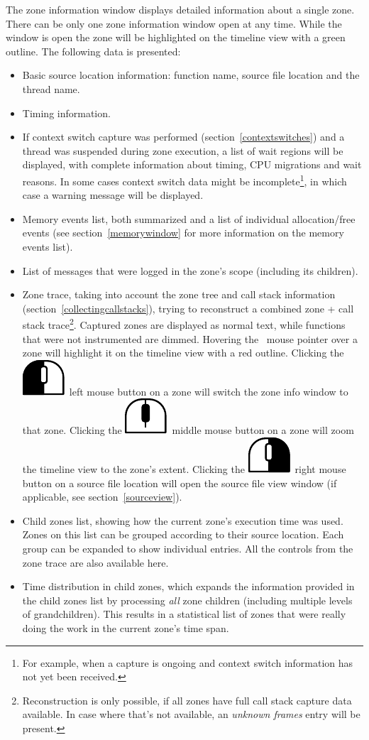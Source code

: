 \documentclass[hidelinks,titlepage,a4paper]{article}
\newcommand{\LMB}{\includegraphics[height=.8\baselineskip]{icons/lmb}}
\newcommand{\RMB}{\includegraphics[height=.8\baselineskip]{icons/rmb}}
\newcommand{\MMB}{\includegraphics[height=.8\baselineskip]{icons/mmb}}
\begin{document}
The zone information window displays detailed information about a single zone. There can be only one zone information window open at any time. While the window is open the zone will be highlighted on the timeline view with a green outline. The following data is presented:

\begin{itemize}
\item Basic source location information: function name, source file location and the thread name.
\item Timing information.
\item If context switch capture was performed (section~\ref{contextswitches}) and a thread was suspended during zone execution, a list of wait regions will be displayed, with complete information about timing, CPU migrations and wait reasons. In some cases context switch data might be incomplete\footnote{For example, when a capture is ongoing and context switch information has not yet been received.}, in which case a warning message will be displayed.
\item Memory events list, both summarized and a list of individual allocation/free events (see section~\ref{memorywindow} for more information on the memory events list).
\item List of messages that were logged in the zone's scope (including its children).
\item Zone trace, taking into account the zone tree and call stack information (section~\ref{collectingcallstacks}), trying to reconstruct a combined zone + call stack trace\footnote{Reconstruction is only possible, if all zones have full call stack capture data available. In case where that's not available, an \emph{unknown frames} entry will be present.}. Captured zones are displayed as normal text, while functions that were not instrumented are dimmed. Hovering the \faMousePointer{}~mouse pointer over a zone will highlight it on the timeline view with a red outline. Clicking the \LMB{}~left mouse button on a zone will switch the zone info window to that zone. Clicking the \MMB{}~middle mouse button on a zone will zoom the timeline view to the zone's extent. Clicking the \RMB{}~right mouse button on a source file location will open the source file view window (if applicable, see section~\ref{sourceview}).
\item Child zones list, showing how the current zone's execution time was used. Zones on this list can be grouped according to their source location. Each group can be expanded to show individual entries. All the controls from the zone trace are also available here.
\item Time distribution in child zones, which expands the information provided in the child zones list by processing \emph{all} zone children (including multiple levels of grandchildren). This results in a statistical list of zones that were really doing the work in the current zone's time span.
\end{itemize}
\end{document}
